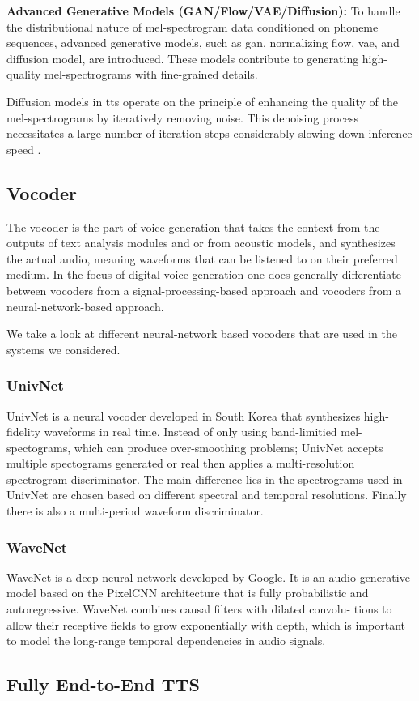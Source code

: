 \textbf{Advanced Generative Models (GAN/Flow/VAE/Diffusion):} To handle the distributional nature of mel-spectrogram data conditioned on phoneme sequences, advanced generative models, such as \gls{gan}, normalizing flow, \gls{vae}, and diffusion model, are introduced. These models contribute to generating high-quality mel-spectrograms with fine-grained details.

Diffusion models in \gls{tts} operate on the principle of enhancing the quality of the mel-spectrograms by iteratively removing noise. This denoising process necessitates a large number of iteration steps considerably slowing down inference speed \cite{acoustic2023models}.

\subsection{Vocoder}

The vocoder is the part of voice generation that takes the context from the outputs of text analysis modules and or from acoustic models, and synthesizes the actual audio, meaning waveforms that can be listened to on their preferred medium. In the focus of digital voice generation one does generally differentiate between vocoders from a signal-processing-based approach and vocoders from a neural-network-based approach.\cite{Tan2023vocoder}

We take a look at different neural-network based vocoders that are used in the systems we considered.

\subsubsection{UnivNet}
UnivNet is a neural vocoder developed in South Korea that synthesizes high-fidelity waveforms in real time. Instead of only using band-limitied mel-spectograms, which can produce over-smoothing problems; UnivNet accepts multiple spectograms generated or real then applies a multi-resolution spectrogram discriminator. The main difference lies in the spectrograms used in UnivNet are chosen based on different spectral and temporal resolutions. Finally there is also a multi-period waveform discriminator.\cite{jang2021univnet}

\subsubsection{WaveNet}
WaveNet is a deep neural network developed by Google. It is an audio generative model based on the PixelCNN architecture that is fully probabilistic and autoregressive. WaveNet combines causal filters with dilated convolu-
tions to allow their receptive fields to grow exponentially with depth, which is important to model
the long-range temporal dependencies in audio signals.\cite{oord2016wavenet}

\subsection{Fully End-to-End TTS}

